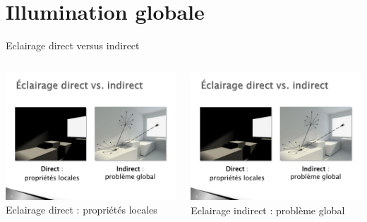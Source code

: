 \section{Illumination globale}

\begin{frame}{Eclairage direct versus indirect}
    \begin{columns}
        \begin{column}{0.49\textwidth}
            \begin{center}
                \includegraphics[width=\columnwidth]{figs/eclairage-direct.pdf}
                Eclairage direct : propriétés locales 
            \end{center}
        \end{column}
        \begin{column}{0.49\textwidth}
            \begin{center}
                \includegraphics[width=\columnwidth]{figs/eclairage-indirect.pdf}
                Eclairage indirect : problème global
            \end{center}
        \end{column}
    \end{columns}
\end{frame}

